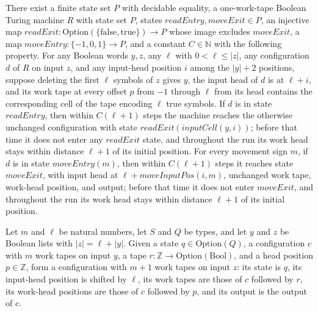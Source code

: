 \begin{theorem}
\label{Turing.exists_rulerDeviceTM}
\leanok
{}
There exist a finite state set $P$ with decidable equality, a one-work-tape Boolean
Turing machine $R$ with state set $P$, states $readEntry,moveExit\in P$, an injective
map $readExit:\mathrm{Option}(\{\mathrm{false},\mathrm{true}\})\to P$ whose image
excludes $moveExit$, a map $moveEntry:\{-1,0,1\}\to P$, and a constant $C\in\mathbb N$
with the following property. For any Boolean words $y,z$, any $\ell$ with $0<\ell\le
|z|$, any configuration $d$ of $R$ on input $z$, and any input-head position $i$ among
the $|y|+2$ positions, suppose deleting the first $\ell$ symbols of $z$ gives $y$, the
input head of $d$ is at $\ell+i$, and its work tape at every offset $p$ from $-1$
through $\ell$ from its head contains the corresponding cell of the tape encoding $\ell$
true symbols. If $d$ is in state $readEntry$, then within $C(\ell+1)$ steps the machine
reaches the otherwise unchanged configuration with state $readExit(inputCell(y,i))$;
before that time it does not enter any $readExit$ state, and throughout the run its work
head stays within distance $\ell+1$ of its initial position. For every movement sign
$m$, if $d$ is in state $moveEntry(m)$, then within $C(\ell+1)$ steps it reaches state
$moveExit$, with input head at $\ell+moveInputPos(i,m)$, unchanged work tape, work-head
position, and output; before that time it does not enter $moveExit$, and throughout the
run its work head stays within distance $\ell+1$ of its initial position.
\end{theorem}

\begin{definition}
\label{Turing.rulerHostCfg}
\leanok
{}
Let $m$ and $\ell$ be natural numbers, let $S$ and $Q$ be types, and let $y$ and $z$ be
Boolean lists with $|z|=\ell+|y|$. Given a state $q\in\mathrm{Option}(Q)$, a
configuration $c$ with $m$ work tapes on input $y$, a tape
$r:\mathbb{Z}\to\mathrm{Option}(\mathrm{Bool})$, and a head position $p\in\mathbb{Z}$,
form a configuration with $m+1$ work tapes on input $z$: its state is $q$, its
input-head position is shifted by $\ell$, its work tapes are those of $c$ followed by
$r$, its work-head positions are those of $c$ followed by $p$, and its output is the
output of $c$.
\end{definition}

